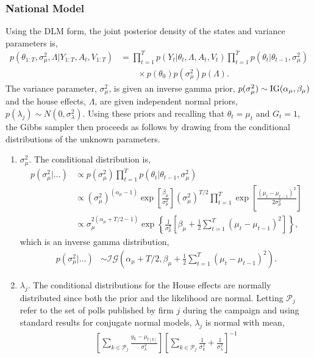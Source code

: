 \documentclass[12pt,final,fleqn]{article}
\theoremstyle{plain}
\begin{document}
\begin{appendices}
\subsubsection{National Model}
Using the DLM form, the joint posterior density of the states and variance parameters is,
\begin{align}
p(\theta_{1:T}, \sigma_\mu^2, \Lambda|Y_{1:T}, A_t, V_{1:T})&=\prod_{t=1}^T p(Y_t|\theta_t, \Lambda, A_t, V_t) \prod_{t=1}^T p(\theta_t|\theta_{t-1}, \sigma_\mu^2) \nonumber\\
&\qquad \times p(\theta_0)p(\sigma_\mu^2)p(\Lambda).
\end{align}
The variance parameter, $\sigma^2_\mu$, is given an inverse gamma prior, $p(\sigma^2_\mu)\sim\rm{IG}(\alpha_\mu, \beta_\mu)$ and the house effects, $\Lambda$, are given independent normal priors, $p(\lambda_j) \sim N(0, \sigma^2_\lambda)$. Using these priors and recalling that $\theta_t = \mu_t$ and $G_t =1$, the Gibbs sampler then proceeds as follows by drawing from the conditional distributions of the unknown parameters.
\begin{enumerate}
\item $\sigma_\mu^2$. The conditional distribution is,
\begin{align}
p(\sigma_\mu^2|\ldots)&\propto p(\sigma_\mu^2) \prod_{t=1}^T p(\theta_{t}|\theta_{t-1}, \sigma_\mu^2) \\
&\propto (\sigma_\mu^2)^{(\alpha_\mu - 1)}\exp\left[\frac{\beta_\mu}{\sigma_\mu^2}\right](\sigma_\mu^2)^{T/2} \prod_{t=1}^T \exp\left[\frac{(\mu_{t} - \mu_{t-1})^2}{2\sigma_\mu^2}\right]\\
&\propto \sigma_\mu^{2(\alpha_\mu + T/2 - 1)}\exp\left\{\frac{1}{\sigma_\mu^2}\left[\beta_\mu + \frac{1}{2}\sum_{t=1}^T(\mu_{t} - \mu_{t-1})^2\right]\right\},
\end{align}
which is an inverse gamma distribution,
\begin{align}
p(\sigma_\mu^2|\ldots)&\sim \mathcal{IG}\left(\alpha_\mu + T/2, \beta_\mu + \frac{1}{2}\sum_{t=1}^T (\mu_{t} - \mu_{t-1})^2  \right).
\end{align}
\item $\lambda_j$. The conditional distributions for the House effects are normally distributed since both the prior and the likelihood are normal. Letting $\mathcal{P}_j$ refer to the set of polls published by firm $j$ during the campaign and using standard results for conjugate normal models, $\lambda_j$ is normal with mean,
\begin{align}
\left[\sum_{k \in \mathcal{P}_j}\frac{y_k - \mu_{t[k]}}{\sigma^2_k}\right] \left[\sum_{k \in \mathcal{P}_j} \frac{1}{\sigma^2_k} + \frac{1}{\sigma^2_\lambda}\right]^{-1}

\end{align}
\end{enumerate}
\end{appendices}
\end{document}

